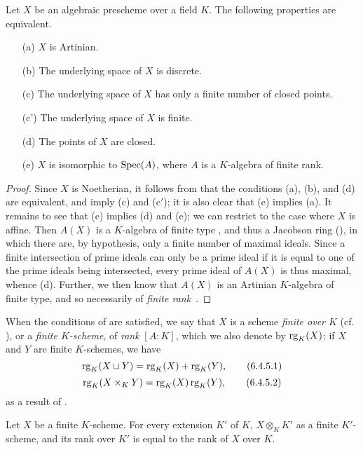 \begin{proposition}[6.4.4]
\label{I.6.4.4}
Let $X$ be an algebraic prescheme over a field $K$.
The following properties are equivalent.
\begin{enumerate}
  \item[{\rm(a)}] $X$ is Artinian.
  \item[{\rm(b)}] The underlying space of $X$ is discrete.
  \item[{\rm(c)}] The underlying space of $X$ has only a finite number of closed points.
  \item[{\rm(c')}] The underlying space of $X$ is finite.
  \item[{\rm(d)}] The points of $X$ are closed.
  \item[{\rm(e)}] $X$ is isomorphic to $\operatorname{Spec}(A)$, where $A$ is a $K$-algebra of finite rank.
\end{enumerate}
\end{proposition}

\begin{proof}
Since $X$ is Noetherian, it follows from  that the conditions (a), (b), and (d) are equivalent, and imply (c) and (c$'$);
it is also clear that (e) implies (a).
It remains to see that (c) implies (d) and (e);
we can restrict to the case where $X$ is affine.
Then $A(X)$ is a $K$-algebra of finite type , and thus a Jacobson ring (\cite[p.~3-11 and 3-12]{I-1}), in which there are, by hypothesis, only a finite number of maximal ideals.
Since a finite intersection of prime ideals can only be a prime ideal if it is equal to one of the prime ideals being intersected, every prime ideal of $A(X)$ is thus maximal, whence (d).
Further, we then know  that $A(X)$ is an Artinian $K$-algebra of finite type, and so necessarily of \emph{finite rank}~\cite{I-21}.
\end{proof}

\begin{env}[6.4.5]
\label{I.6.4.5}
When the conditions of  are satisfied, we say that $X$ is a scheme \emph{finite over $K$} (cf. ), or a \emph{finite $K$-scheme}, of \emph{rank} $[A:K]$, which we also denote by $\operatorname{rg}_K(X)$;
if $X$ and $Y$ are finite $K$-schemes, we have
\[
  \operatorname{rg}_K(X\sqcup Y)=\operatorname{rg}_K(X)+\operatorname{rg}_K(Y),
  \tag{6.4.5.1}
\]
\[
  \operatorname{rg}_K(X\times_K Y)=\operatorname{rg}_K(X)\operatorname{rg}_K(Y),
  \tag{6.4.5.2}
\]
as a result of .
\end{env}

\begin{corollary}[6.4.6]
\label{I.6.4.6}
Let $X$ be a finite $K$-scheme.
For every extension $K'$ of $K$, $X\otimes_K K'$ as a finite $K'$-scheme, and its rank over $K'$ is equal to the rank of $X$ over $K$.
\end{corollary}

